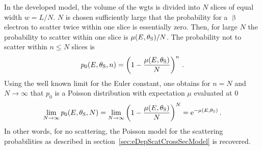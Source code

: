 In the developed model, the volume of the \gls{wgts} is divided into $N$ slices of equal width $w=L/N$. $N$ is chosen sufficiently large that the probability for a $\upbeta$ electron to scatter twice within one slice is essentially zero. Then, for large $N$ the probability to scatter within one slice is $\mu(E,\theta_\mathrm{S})/N$. The probability not to scatter within $n \leq N$ slices is
\begin{equation}
    p_0(E,\theta_\mathrm{S},n) =
    \left(
        1-\frac{\mu(E,\theta_\mathrm{S})}{N}
    \right)^n
    \text{\,.}
\end{equation}
Using the well known limit for the Euler constant, one obtains for $n=N$ and $N\rightarrow\infty$ that $p_0$ is a Poisson distribution with expectation $\mu$ evaluated at 0 
\begin{align}
    \lim_{N\rightarrow\infty} 
    p_0(E,\theta_\mathrm{S},N) =
    \lim_{N\rightarrow\infty} 
    \left(
        1-\frac{\mu(E,\theta_\mathrm{S})}{N}
    \right)^N =
    \mathrm{e}^{-\mu(E,\theta_\mathrm{S})}
    \text{\,.}
\end{align}
In other words, for no scattering, the Poisson model for the scattering probabilities as described in section~\ref{sec:eDepScatCrossSecModel} is recovered.

